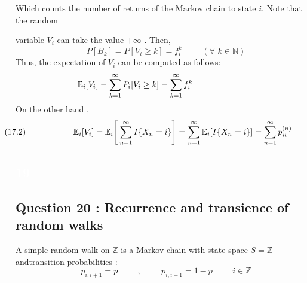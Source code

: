 \documentclass[a4paper]{article}
\begin{document}
{{	Which counts the number of returns of the Markov chain to state $i$. Note that the random
	
	variable $V_i$ can take the value $+\infty$ . Then, \[P[B_k] = P[V_i \geq k] = f^k_{i} \hspace{1cm} (\forall\,\, k \in {\mathbb N} ) \]
	Thus, the expectation of $V_i$ can be computed as follows:
	\[\hspace{-6cm}(17.1) \hspace{2.5cm} {\mathbb E}_i[V_i]  = \sum_{k=1}^{\infty} P_i[V_i \geq k] = \sum_{k=1}^{\infty} f^{k}_i \]
	On the other hand ,
	\[\hspace{-1.5cm}(17.2) \hspace{2cm} {\mathbb E}_i[V_i]  = {\mathbb E}_i\Bigg[\sum_{n=1}^{\infty} I{\{X_n = i\}}\Bigg] = \sum_{n=1}^{\infty} {\mathbb E}_i[I{\{X_n = i\}}] = \sum_{n=1}^{\infty} p^{(n)}_{ii}\]
	
	

	
	\vspace{0.5cm}
	{\tiny \textcolor{white}{\subsection{19}}}
	
	\subsection{{\Large Question 20 :} Recurrence and transience of random walks}
	A simple random walk on ${\mathbb Z}$ is a Markov chain with state space ${S = \mathbb Z}$ andtransition probabilities : \[p_{i,i+1} = p\hspace{1cm} , \hspace{1cm} p_{i,i-1} = 1-p\hspace{1cm} i \in {\mathbb Z}\]
	
}}
\end{document}
